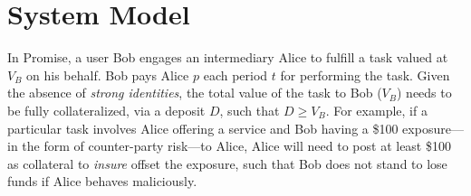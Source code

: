 \documentclass[runningheads]{llncs}
\newcommand{\sys}{Promise\xspace}
\newcommand{\dom}[1]{\todo[linecolor=green,backgroundcolor=green!25,bordercolor=green,inline,caption={}]{Comment by Dominik: #1}}
\begin{document}








\section{System Model}
\label{sec:model}

In \sys, a user Bob engages an intermediary Alice to fulfill a task valued at $V_B$ on his behalf.
Bob pays Alice $p$ each period $t$ for performing the task. %
Given the absence of \textit{strong identities}, the total value of the task to Bob ($V_B$) needs to be fully collateralized, via a deposit $D$, such that $D \geq V_B$.
For example, if a particular task involves Alice offering a service and Bob having a \$100 exposure---in the form of counter-party risk---to Alice, Alice will need to post at least \$100 as collateral to \textit{insure} offset the exposure, such that Bob does not stand to lose funds if Alice behaves maliciously. %
\end{document}
